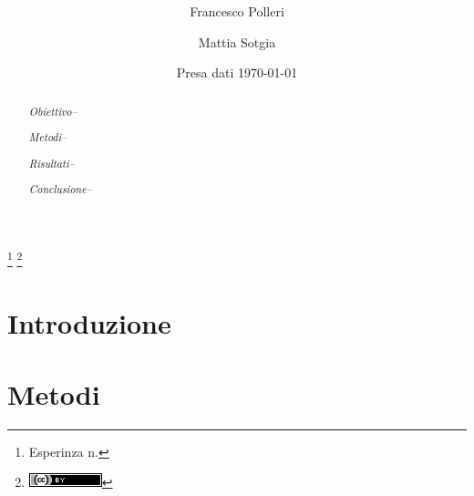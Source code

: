 \documentclass[
    reprint, 
    superscriptaddress, 
    altaffilletter, 
    amsmath, 
    amssymb, 
    a4paper]{revtex4-2}
\begin{document}
\title{%
}
\thanks{Esperinza n. %
}
\thanks{\includegraphics[scale=0.4]{style/80x15.png}}

\author{Francesco Polleri}
\author{Mattia Sotgia}


\date{Presa dati
    \today
}

\begin{abstract}
    \textit{Obiettivo-- }
    
    \textit{Metodi-- }
    
    \textit{Risultati-- }
        
    \textit{Conclusione-- }
        
\end{abstract}
\maketitle
\thispagestyle{fancy}


\section{Introduzione}
\label{section:introduction}


\section{Metodi}
\label{section:methods}

\end{document}
